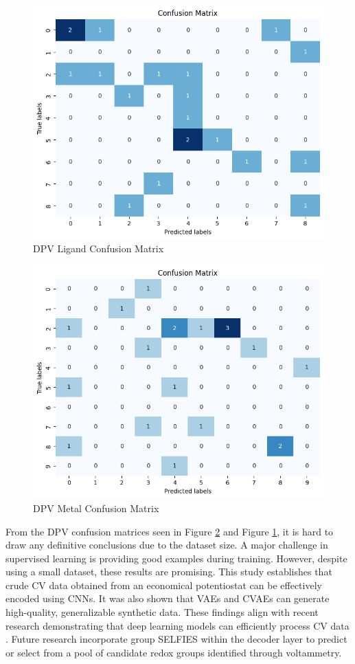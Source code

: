 \begin{figure}[h!]
  \centering
    \includegraphics[width=1.0\textwidth]{figures/dpv_ligand_matrix.png}
    \caption{DPV Ligand Confusion Matrix}
    \label{dpv_ligand_matrix}
\end{figure}
\begin{figure}[h!]
  \centering
    \includegraphics[width=1.0\textwidth]{figures/dpv_metal_matrix.png}
    \caption{DPV Metal Confusion Matrix}
    \label{dpv_metal_matrix}
\end{figure}
From the DPV confusion matrices seen in Figure \ref{dpv_metal_matrix} and Figure \ref{dpv_ligand_matrix}, it is hard to draw any definitive conclusions due to the dataset size. 
A major challenge in supervised learning is providing good examples during training. However, despite using a small dataset, these results are promising. This study establishes that crude CV data obtained from an economical potentiostat can be effectively encoded using CNNs. It was also shown that VAEs and CVAEs can generate high-quality, generalizable synthetic data. These findings align with recent research demonstrating that deep learning models can efficiently process CV data \cite{Hoar2022}. Future research incorporate group SELFIES within the decoder layer to predict or select from a pool of candidate redox groups identified through voltammetry. 
